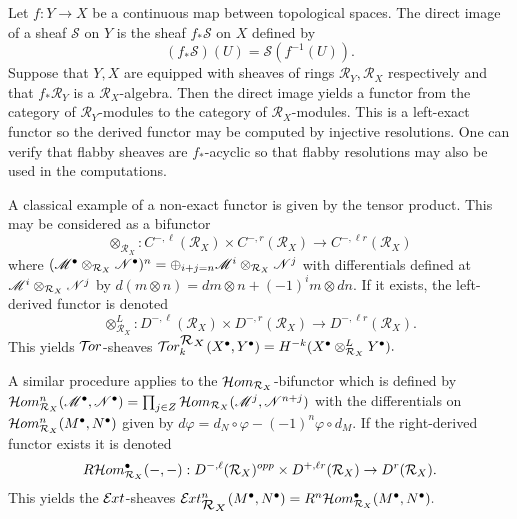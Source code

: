 Let $f:Y\to X$ be a continuous map between topological spaces.
The direct image of a sheaf $\mathcal{S}$ on $Y$ is the sheaf $f_*\mathcal{S}$ on $X$ defined by
$$(f_*\mathcal{S})(U) = \mathcal{S}(f^{-1}(U)). $$
Suppose that $Y,X$ are equipped with sheaves of rings $\mathcal{R}_Y, \mathcal{R}_X$ respectively and that $f_*\mathcal{R}_Y$ is a $\mathcal{R}_X$-algebra.
Then the direct image yields a functor from the category of $\mathcal{R}_Y$-modules to the category of $\mathcal{R}_X$-modules.
This is a left-exact functor so the derived functor may be computed by injective resolutions.
One can verify that flabby sheaves are $f_*$-acyclic so that flabby resolutions may also be used in the computations.

A classical example of a non-exact functor is given by the tensor product.
This may be considered as a bifunctor
$$ \otimes_{\mathcal{R}_X} : C^{-,\ell}(\mathcal{R}_X)\times C^{-,r}(\mathcal{R}_X)\to C^{-,\ell r}(\mathcal{R}_X)$$
where
$(\mathscr{M}^\bullet \otimes_{\mathcal{R}_X} \mathscr{N}^\bullet)^n = \oplus_{i + j = n} \mathscr{M}^i \otimes_{\mathcal{R}_X} \mathscr{N}^j $
with differentials defined at $\mathscr{M}^i \otimes_{\mathcal{R}_X} \mathscr{N}^j$ by
$d(m\otimes n) = dm \otimes n + (-1)^i m \otimes dn.$
If it exists, the left-derived functor is denoted
$$ \otimes_{\mathcal{R}_X}^L : D^{-,\ell}(\mathcal{R}_X)\times D^{-,r}(\mathcal{R}_X)\to D^{-,\ell r}(\mathcal{R}_X).$$
This yields $\mathcal{T}\mkern -3mu or$-sheaves
$\Tr{\mathcal{R}_X}{k}(X^\bullet, Y^\bullet) = H^{-k}(X^\bullet\otimes_{\mathcal{R}_X}^L Y^\bullet).$

A similar procedure applies to the $\mathcal{H}om_{\mathcal{R}_X}$-bifunctor which is defined by
$\mathcal{H}om_{\mathcal{R}_X}^n(\mathscr{M}^\bullet, \mathscr{N}^\bullet) \allowbreak = \prod_{j\in Z} \mathcal{H}om_{\mathcal{R}_X}(\mathscr{M}^j , \mathscr{N}^{n+j}) $
with the differentials on $\mathcal{H}om_{\mathcal{R}_X}^n(M^\bullet,N^\bullet)$ given by $d\varphi = d_N\circ \varphi - (-1)^n \varphi \circ d_M$.
If the right-derived functor exists it is denoted
$$R\mathcal{H}om_{\mathcal{R}_X}^\bullet({-},{-}): D^{-,\ell}(\mathcal{R}_X)^{opp}\times D^{+,\ell r}(\mathcal{R}_X)\to D^{r}(\mathcal{R}_X).$$
This yields the $\mathcal{E}\mkern -1mu xt$-sheaves
$\Ex{\mathcal{R}_X}{n}(M^\bullet,N^\bullet) =  R^n\Hom_{\mathcal{R}_X}^\bullet(M^\bullet, N^\bullet).$
